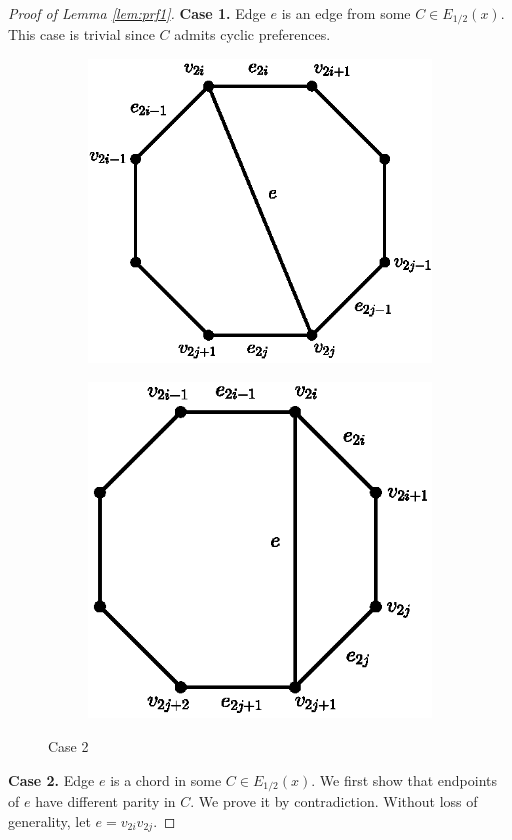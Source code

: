 \documentclass[11pt]{article}
\numberwithin{theorem}{section}
\begin{document}
\begin{proof}[Proof of Lemma \ref{lem:prf1}]
\textbf{Case 1.} Edge $e$ is an edge from some $C\in E_{1/2}(x)$. This case is trivial since $C$ admits cyclic preferences.

\begin{figure}
\centering
\begin{subfigure}{.4\textwidth}
  \centering
  \includegraphics[width=.85\linewidth]{KernelMengerian-fig1a}
  \caption{}
  \label{fig1a}
\end{subfigure}%
\begin{subfigure}{.4\textwidth}
  \centering
  \includegraphics[width=.845\linewidth]{KernelMengerian-fig1b}
  \caption{}
  \label{fig1b}
\end{subfigure}
\caption{Case 2}
\end{figure}
\textbf{Case 2.} Edge $e$ is a chord in some $C\in E_{1/2}(x)$. We first show that endpoints of $e$ have different parity in $C$. We prove it by contradiction. Without loss of generality, let $e=v_{2i}v_{2j}$.


\end{proof}
\end{document}
